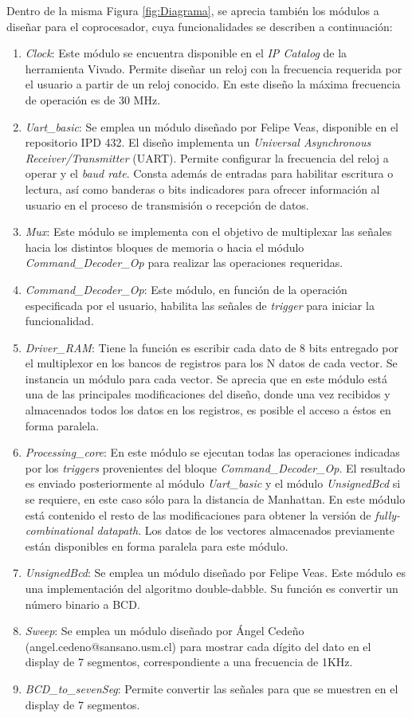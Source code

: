 \documentclass[conference]{IEEEtran}
\begin{document}
Dentro de la misma Figura \ref{fig:Diagrama}, se aprecia también los módulos a diseñar para el coprocesador, cuya funcionalidades se describen a continuación:
\begin{enumerate}
\setlength\itemsep{1em}
    \item \textit{Clock}: Este módulo se encuentra disponible en el \textit{IP Catalog} de la herramienta Vivado. Permite diseñar un reloj con la frecuencia requerida por el usuario a partir de un reloj conocido. En este diseño la máxima frecuencia de operación es de  30 MHz.
    \item \textit{Uart\_basic}: Se emplea  un módulo diseñado por  Felipe Veas, disponible en el repositorio IPD 432. El diseño implementa un \textit{Universal Asynchronous Receiver/Transmitter} (UART). Permite configurar la frecuencia del reloj a operar y el \textit{baud rate}. Consta además de entradas para habilitar escritura o lectura, así como banderas o bits indicadores para ofrecer información al usuario en el proceso de transmisión o recepción de datos.
    \item \textit{Mux}: Este módulo se implementa con el objetivo de multiplexar las señales hacia los distintos bloques de memoria o hacia el módulo \textit{Command\_Decoder\_Op} para realizar las operaciones requeridas.
    \item  \textit{Command\_Decoder\_Op}: Este módulo, en función de la operación especificada por el usuario, habilita las señales de \textit{trigger} para iniciar la funcionalidad.
    \item \textit{Driver\_RAM}: Tiene la función es escribir cada dato  de 8 bits entregado por el multiplexor en los bancos de registros para los N datos de cada vector. Se instancia un módulo para cada vector. Se aprecia que en este módulo está una de las principales modificaciones del diseño, donde una vez recibidos y almacenados todos los datos en los registros, es posible el acceso a éstos en forma paralela.
    \item \textit{Processing\_core}: En este módulo se ejecutan todas las operaciones indicadas por los \textit{triggers} provenientes del bloque \textit{Command\_Decoder\_Op}. El resultado es enviado posteriormente al módulo \textit{Uart\_basic} y el módulo \textit{UnsignedBcd} si se requiere, en este caso sólo para la distancia de Manhattan. En este módulo está contenido el resto de las modificaciones para obtener la versión de \textit{fully-combinational datapath}. Los datos de los vectores almacenados previamente están disponibles en forma paralela para este módulo.   
    \item \textit{UnsignedBcd}: Se emplea un módulo diseñado por  Felipe Veas. Este módulo es una implementación del algoritmo double-dabble. Su función es convertir un número binario a BCD. 
    \item \textit{Sweep}: Se emplea un módulo diseñado por Ángel Cedeño (angel.cedeno@sansano.usm.cl) para mostrar cada dígito del dato en el display de 7 segmentos, correspondiente a una frecuencia de 1KHz.
    \item \textit{BCD\_to\_sevenSeg}: Permite convertir las señales para que se muestren en el display de 7 segmentos. 
\end{enumerate}
\end{document}
